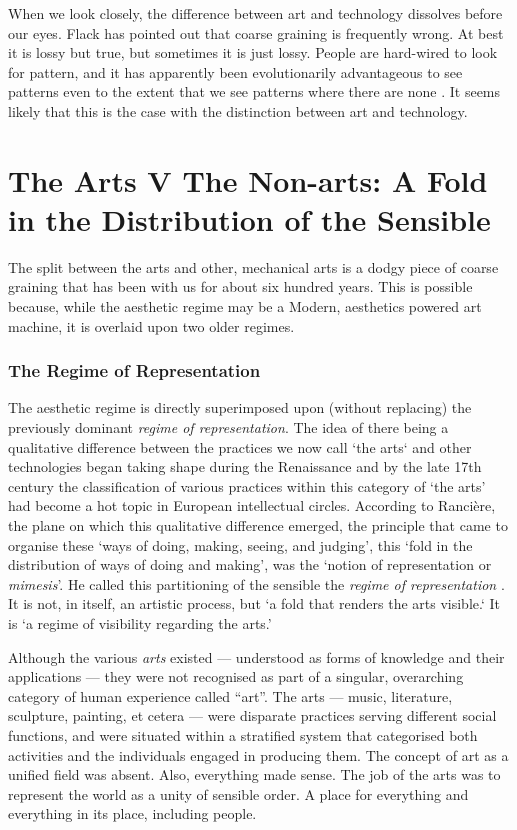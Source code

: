 \documentclass[letterpaper]{article}
\begin{document}
    When we look closely, the difference between art and technology dissolves before our eyes. Flack has pointed out that coarse graining is frequently wrong. At best it is lossy but true, but sometimes it is just lossy. People are hard-wired to look for pattern, and it has apparently been evolutionarily advantageous to see patterns even to the extent that we see patterns where there are none \citep{FristonThFrEnrgPrncpl2010}. It seems likely that this is the case with the distinction between art and technology.

\section{The Arts V The Non-arts: A Fold in the Distribution of the Sensible}
    
    The split between the arts and other, mechanical arts is a dodgy piece of coarse graining that has been with us for about six hundred years. This is possible because, while the aesthetic regime may be a Modern, aesthetics powered art machine, it is overlaid upon two older regimes. 
    
    \subsubsection{The Regime of Representation}

    The aesthetic regime is directly superimposed upon (without replacing) the previously dominant \emph{regime of representation}. The idea of there being a qualitative difference between the practices we now call ‘the arts‘ and other technologies began taking shape during the Renaissance \citep[p.136]{TatarkiewiczWhtIsArt1971} and by the late 17th century the classification of various practices within this category of ‘the arts’ had become a hot topic in European intellectual circles. According to Rancière, the plane on which this qualitative difference emerged, the principle that came to organise these ‘ways of doing, making, seeing, and judging’, this ‘fold in the distribution of ways of doing and making’, was the ‘notion of representation or \emph{mimesis}’. He called this partitioning of the sensible the \emph{regime of representation} \citep[p.22]{RancierPltcsOfThAsthtcs2004}. It is not, in itself, an artistic process, but ‘a fold that renders the arts visible.‘ It is  ‘a regime of visibility regarding the arts.’
    
    Although the various \emph{arts} existed — understood as forms of knowledge and their applications — they were not recognised as part of a singular, overarching category of human experience called “art”. The arts — music, literature, sculpture, painting, et cetera — were disparate practices serving different social functions, and were situated within a stratified system that categorised both activities and the individuals engaged in producing them. The concept of art as a unified field was absent. Also, everything made sense. The job of the arts was to represent the world as a unity of sensible order. A place for everything and everything in its place, including people.
    
\end{document}
